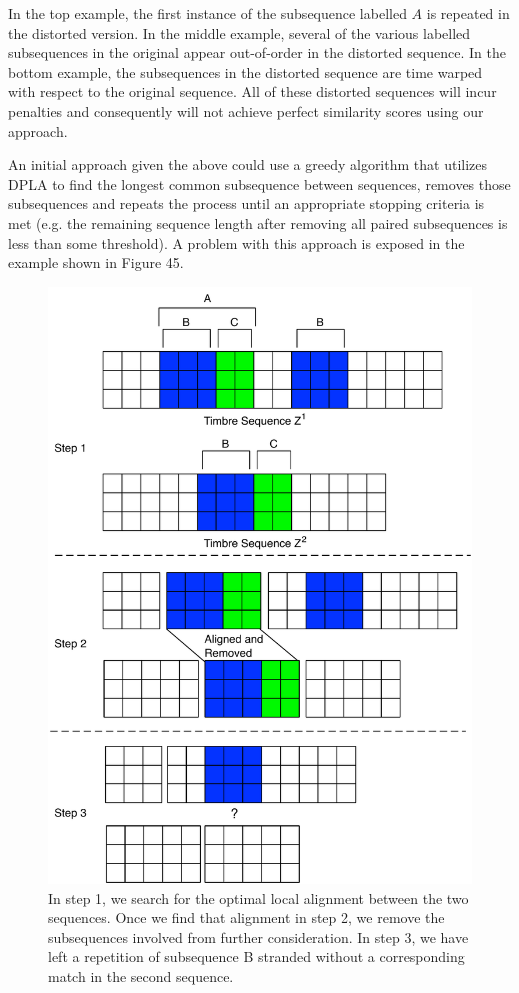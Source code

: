 \documentclass[12pt]{report} 	%
\numberwithin{figure}{chapter}
\numberwithin{table}{chapter}
\numberwithin{equation}{chapter}
\begin{document}
\begin{flushleft}
In the top example, the first instance of the subsequence labelled $A$ is repeated in the distorted version. In the middle example, several of the various labelled subsequences in the original appear out-of-order in the distorted sequence. In the bottom example, the subsequences  in the distorted sequence are time warped with respect to the original sequence. All of these distorted sequences will incur penalties and consequently will not achieve perfect similarity scores using our approach.

An initial approach given the above could use a greedy algorithm that utilizes DPLA to find the longest common subsequence between sequences, removes those subsequences and repeats the process until an appropriate stopping criteria is met (e.g. the remaining sequence length after removing all paired subsequences is less than some threshold). A problem with this approach is exposed in the example shown in Figure 45. 
\begin{figure}[!p]
\begin{center}
\includegraphics[scale=0.6]{GreedyMatching1}
\caption[Symmetric greedy removal after matching]{In step 1, we search for the optimal local alignment between the two sequences. Once we find that alignment in step 2, we remove the subsequences involved from further consideration. In step 3, we have left a repetition of subsequence B stranded without a corresponding match in the second sequence.}
\end{center}
\vspace{6pt}
\end{figure}


\end{flushleft}
\end{document}
